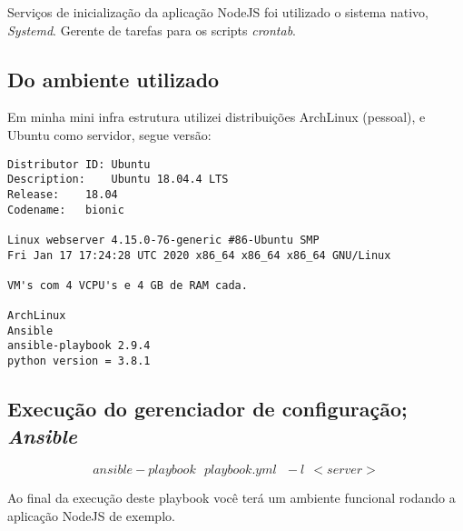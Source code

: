 Serviços de inicialização da aplicação NodeJS foi utilizado o sistema
nativo, \emph{Systemd}. Gerente de tarefas para os scripts
\emph{crontab}.


\subsection{Do ambiente utilizado}
Em minha mini infra estrutura utilizei distribuições ArchLinux (pessoal), e
Ubuntu como servidor, segue versão:

\begin{verbatim}
Distributor ID:	Ubuntu
Description:	Ubuntu 18.04.4 LTS
Release:	18.04
Codename:	bionic

Linux webserver 4.15.0-76-generic #86-Ubuntu SMP
Fri Jan 17 17:24:28 UTC 2020 x86_64 x86_64 x86_64 GNU/Linux

VM's com 4 VCPU's e 4 GB de RAM cada.

ArchLinux
Ansible
ansible-playbook 2.9.4
python version = 3.8.1
\end{verbatim}


\subsection{Execução do gerenciador de configuração; \emph{Ansible}}
$$ansible-playbook\ \ \ playbook.yml\ \ \ -l\ \ <server>$$

Ao final da execução deste playbook você terá um ambiente funcional
rodando a aplicação NodeJS de exemplo.




